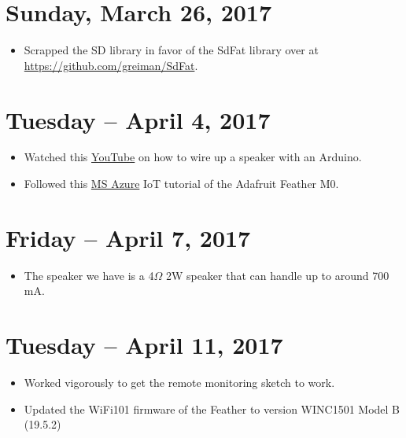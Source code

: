 \documentclass[12pt]{article}
\begin{document}
\section{Sunday, March 26, 2017}
\begin{itemize}
\item Scrapped the SD library in favor of the SdFat library over at \url{https://github.com/greiman/SdFat}.
\end{itemize}


\section{Tuesday -- April 4, 2017}
\begin{itemize}
\item Watched this \href{https://www.youtube.com/watch?v=wLlsVXBaQLQ}{YouTube} on how to wire up a speaker with an Arduino.
\item Followed this \href{https://docs.microsoft.com/en-us/azure/iot-hub/iot-hub-adafruit-feather-m0-wifi-kit-arduino-get-started}{MS Azure} IoT tutorial of the Adafruit Feather M0.
\end{itemize}

\section{Friday -- April 7, 2017}
\begin{itemize}
\item The speaker we have is a 4$\Omega$ 2W speaker that can handle up to around 700 mA.
\end{itemize}

\section{Tuesday -- April 11, 2017}
\begin{itemize}
\item Worked vigorously to get the remote monitoring sketch to work.
\item Updated the WiFi101 firmware of the Feather to version WINC1501 Model B (19.5.2)
\end{itemize}
\end{document}
